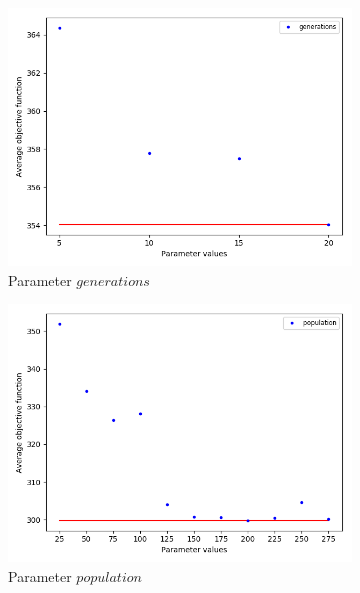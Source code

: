 \begin{figure}
\begin{subfigure}[b]{.49\linewidth}
\centering
\includegraphics[width=\linewidth]{./img/best-generation.png}
\caption{ Parameter $generations$}\label{fig2a}
\end{subfigure}\hfill
\begin{subfigure}[b]{.49\linewidth}
\centering
\includegraphics[width=\linewidth]{./img/best-population.png}
\caption{Parameter $population$ }\label{fig2b}
\end{subfigure}\vfill
\begin{subfigure}[b]{.49\linewidth}
\centering

\end{subfigure}
\end{figure}
